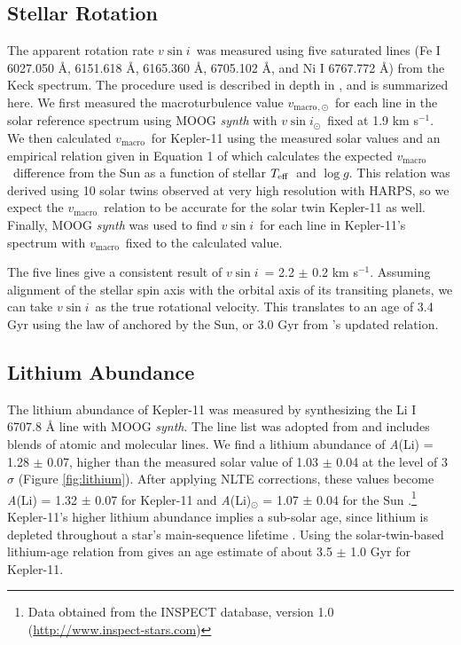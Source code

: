 \documentclass[twocolumn,trackchanges]{aastex61}
\newcommand{\teff}{$T_{\rm eff}$}
\newcommand{\logg}{$\log g$}
\newcommand{\vsini}{$v \sin{i}$}
\newcommand{\vmacro}{$v_{\mathrm{macro}}$}
\newcommand{\kms}{km s$^{-1}$}
\begin{document}
\subsection{Stellar Rotation}

The apparent rotation rate \vsini\ was measured using five saturated lines (Fe I 6027.050 \r{A}, 6151.618 \r{A}, 6165.360 \r{A}, 6705.102 \r{A}, and Ni I 6767.772 \r{A}) from the Keck spectrum. The procedure used is described in depth in \citet{dosSantos2016}, and is summarized here. We first measured the macroturbulence value \vmacro$_{,\odot}$\ for each line in the solar reference spectrum using MOOG \textit{synth} with \vsini$_{\odot}$\ fixed at 1.9 \kms. We then calculated \vmacro\ for Kepler-11 using the measured solar values and an empirical relation given in Equation 1 of \citet{dosSantos2016} which calculates the expected \vmacro\ difference from the Sun as a function of stellar \teff\ and \logg. This relation was derived using 10 solar twins observed at very high resolution with HARPS, so we expect the \vmacro\ relation to be accurate for the solar twin Kepler-11 as well. Finally, MOOG \textit{synth} was used to find \vsini\ for each line in Kepler-11's spectrum with \vmacro\ fixed to the calculated value.

The five lines give a consistent result of \vsini\ = 2.2 $\pm$ 0.2 \kms. Assuming alignment of the stellar spin axis with the orbital axis of its transiting planets, we can take \vsini\ as the true rotational velocity. This translates to an age of 3.4 Gyr using the law of \citet{Skumanich1972} anchored by the Sun, or 3.0 Gyr from \citet{dosSantos2016}'s updated relation.

\subsection{Lithium Abundance}
\label{s:lithium}

The lithium abundance of Kepler-11 was measured by synthesizing the Li I 6707.8 \r{A} line with MOOG \textit{synth}. The line list was adopted from \citet{Melendez2012} and includes blends of atomic and molecular lines. We find a lithium abundance of \textit{A}(Li) = 1.28 $\pm$ 0.07, higher than the measured solar value of 1.03 $\pm$ 0.04 at the level of 3$\sigma$ (Figure \ref{fig:lithium}). After applying NLTE corrections, these values become \textit{A}(Li) = 1.32 $\pm$ 0.07 for Kepler-11 and \textit{A}(Li)$_{\odot}$ = 1.07 $\pm$ 0.04 for the Sun \citep{Lind2009}.\footnote{Data obtained from the INSPECT database, version 1.0 (\url{http://www.inspect-stars.com})} Kepler-11's higher lithium abundance implies a sub-solar age, since lithium is depleted throughout a star's main-sequence lifetime \citep{Duncan1981}. Using the solar-twin-based lithium-age relation from \citet{Carlos2016} gives an age estimate of about 3.5 $\pm$ 1.0 Gyr for Kepler-11.
\end{document}
